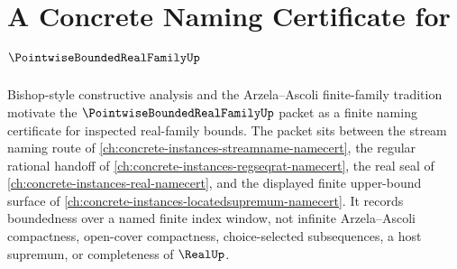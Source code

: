 \chapter{A Concrete Naming Certificate for $\PointwiseBoundedRealFamilyUp$}
\label{ch:concrete-instances-pointwise-bounded-real-family-namecert}

Bishop-style constructive analysis and the Arzela--Ascoli finite-family tradition motivate the $\PointwiseBoundedRealFamilyUp$ packet as a finite naming certificate for inspected real-family bounds. The packet sits between the stream naming route of \autoref{ch:concrete-instances-streamname-namecert}, the regular rational handoff of \autoref{ch:concrete-instances-regseqrat-namecert}, the real seal of \autoref{ch:concrete-instances-real-namecert}, and the displayed finite upper-bound surface of \autoref{ch:concrete-instances-locatedsupremum-namecert}. It records boundedness over a named finite index window, not infinite Arzela--Ascoli compactness, open-cover compactness, choice-selected subsequences, a host supremum, or completeness of $\RealUp$.

